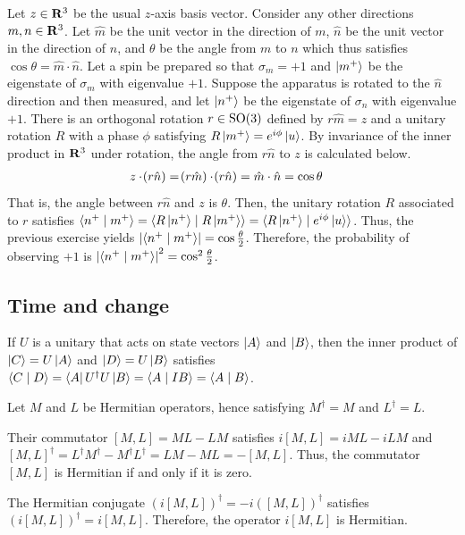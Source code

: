 \begin{answer}
	Let $z \in \mathbf{R}^3$ be the usual $z$-axis basis vector.
	Consider any other directions $m, n \in \mathbf{R}^3$.
	Let $\hat{m}$ be the unit vector in the direction of $m$, $\hat{n}$ be the unit vector in the direction of $n$, and $\theta$ be the angle from $m$ to $n$ which thus satisfies $\cos \theta = \hat{m} \cdot \hat{n}$.
	Let a spin be prepared so that $\sigma_m = +1$ and $\ket{m^+}$ be the eigenstate of $\sigma_m$ with eigenvalue $+1$.
	Suppose the apparatus is rotated to the $\hat{n}$ direction and then measured, and let $\ket{n^+}$ be the eigenstate of $\sigma_n$ with eigenvalue $+1$.
	There is an orthogonal rotation $r \in \operatorname{SO}\!\left(3\right)$ defined by $r \hat{m} = z$ and a unitary rotation $R$ with a phase $\phi$ satisfying $R \ket{m^+} = e^{i \phi}\ket{u}$.
	By invariance of the inner product in $\mathbf{R}^3$ under rotation, the angle from $r \hat{n}$ to $z$ is calculated below.
	\begin{align}
		z \cdot \!\left(r \hat{n}\right) & = \!\left(r \hat{m}\right) \cdot \!\left(r \hat{n}\right)
		= \hat{m} \cdot \hat{n}
		= \cos \theta
	\end{align}
	That is, the angle between $r \hat{n}$ and $z$ is $\theta$.
	Then, the unitary rotation $R$ associated to $r$ satisfies $\braket{n^+ \mid m^+} = \braket{R \ket{n^+} \mid R \ket{m^+} } = \braket{R \ket{n^+} \mid e^{i \phi} \ket{u} }$.
	Thus, the previous exercise yields $\left|\braket{n^+ \mid m^+}\right| = \cos \frac{\theta}{2}$.
	Therefore, the probability of observing $+1$ is $\left|\braket{n^+ \mid m^+}\right|^2 = \cos^2 \frac{\theta}{2}$.
\end{answer}

\subsection{Time and change}

\begin{answer}
	If $U$ is a unitary that acts on state vectors $\ket{A}$ and $\ket{B}$, then the inner product of $\ket{C} = U \ket{A}$ and $\ket{D} = U \ket{B}$ satisfies $\braket{C \mid D} = \bra{A} U^\dagger U \ket{B} = \braket{A \mid I B} = \braket{A \mid B}$.
\end{answer}

\begin{answer}
	Let $M$ and $L$ be Hermitian operators, hence satisfying $M^\dagger = M$ and $L^\dagger = L$.

	Their commutator $[M, L] = M L - L M$ satisfies $i [M, L] = i M L - i L M$ and $[M, L]^\dagger = L^\dagger M^\dagger - M^\dagger L^\dagger = L M - M L = - [M, L]$.
	Thus, the commutator $[M, L]$ is Hermitian if and only if it is zero.

	The Hermitian conjugate $\left(i[M, L]\right)^\dagger = -i \left([M, L]\right)^\dagger$ satisfies $\left(i [M, L]\right)^\dagger = i [M, L]$.
	Therefore, the operator $i [M, L]$ is Hermitian.
\end{answer}

